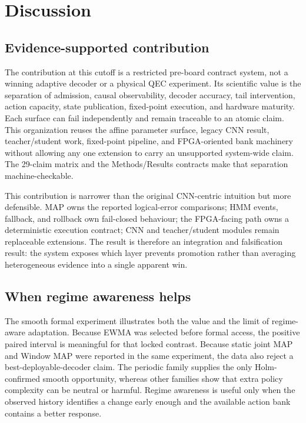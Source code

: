 \documentclass[11pt]{article}
\begin{document}
\clearpage
\section{Discussion}

\subsection{Evidence-supported contribution}

The contribution at this cutoff is a restricted pre-board contract system, not
a winning adaptive decoder or a physical QEC experiment.  Its scientific value
is the separation of admission, causal observability, decoder accuracy, tail
intervention, action capacity, state publication, fixed-point execution, and
hardware maturity.  Each surface can fail independently and remain traceable
to an atomic claim.  This organization reuses the affine parameter surface,
legacy CNN result, teacher/student work, fixed-point pipeline, and
FPGA-oriented bank machinery without allowing any one extension to carry an
unsupported system-wide claim.  The 29-claim matrix and the Methods/Results
contracts make that separation machine-checkable.

This contribution is narrower than the original CNN-centric intuition but more
defensible.  MAP owns the reported logical-error comparisons; HMM events,
fallback, and rollback own fail-closed behaviour; the FPGA-facing path owns a
deterministic execution contract; CNN and teacher/student modules remain
replaceable extensions.  The result is therefore an integration and
falsification result: the system exposes which layer prevents promotion rather
than averaging heterogeneous evidence into a single apparent win.

\subsection{When regime awareness helps}

The smooth formal experiment illustrates both the value and the limit of
regime-aware adaptation.  Because EWMA was selected before formal access, the
positive paired interval is meaningful for that locked contrast.  Because
static joint MAP and Window MAP were reported in the same experiment, the data
also reject a best-deployable-decoder claim.  The periodic family supplies the
only Holm-confirmed smooth opportunity, whereas other families show that extra
policy complexity can be neutral or harmful.  Regime awareness is useful only
when the observed history identifies a change early enough and the available
action bank contains a better response.
\end{document}
